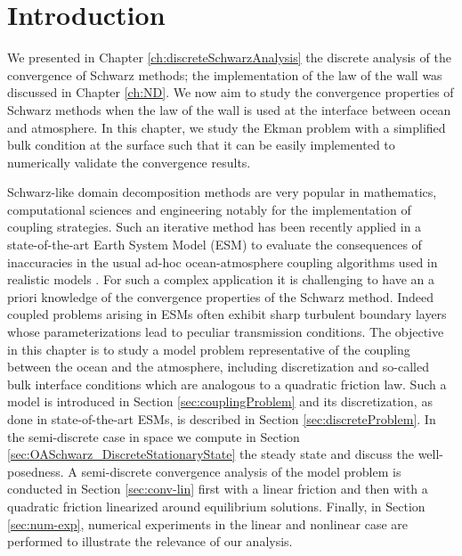\section{Introduction}
\label{sec:OASchwarz_Intro}
We presented in Chapter \ref{ch:discreteSchwarzAnalysis}
the discrete analysis of the convergence of Schwarz methods;
the implementation of the law of the wall was discussed
in Chapter \ref{ch:ND}. We now aim to study the convergence
properties of Schwarz methods when the law of the wall is
used at the interface between ocean and
atmosphere. In this chapter, we study the Ekman problem with a
simplified bulk condition at the surface such that
it can be easily implemented to numerically validate the
convergence results.
\par
Schwarz-like domain decomposition methods are very popular in 
mathematics, computational sciences and engineering notably for 
the implementation of coupling strategies. Such an iterative method
has been recently applied in a state-of-the-art Earth 
System Model (ESM) to evaluate the consequences of inaccuracies 
in the usual ad-hoc ocean-atmosphere coupling algorithms 
used in realistic models \cite{marti_schwarz_2021}. For such 
a complex application it is challenging to have an a priori 
knowledge of the convergence properties of the Schwarz method. 
Indeed coupled problems arising in ESMs often 
exhibit sharp turbulent boundary layers whose parameterizations 
lead to peculiar transmission conditions. The objective in
this chapter is to study a model problem representative 
of the coupling between the ocean and the atmosphere, including discretization 
and so-called bulk interface conditions which are analogous to a 
quadratic friction law. Such a model is introduced in Section \ref{sec:couplingProblem}
and its discretization, as done in state-of-the-art ESMs, 
is described in Section \ref{sec:discreteProblem}.
In the semi-discrete case in space we compute in Section
\ref{sec:OASchwarz_DiscreteStationaryState} the steady state
and discuss the well-posedness.
A semi-discrete convergence analysis of the model problem is conducted
in Section \ref{sec:conv-lin} first with a linear friction and then
with a quadratic friction linearized around equilibrium solutions. 
Finally, in Section \ref{sec:num-exp}, numerical experiments in the 
linear and nonlinear case are performed to illustrate the relevance 
of our analysis. \par
%
